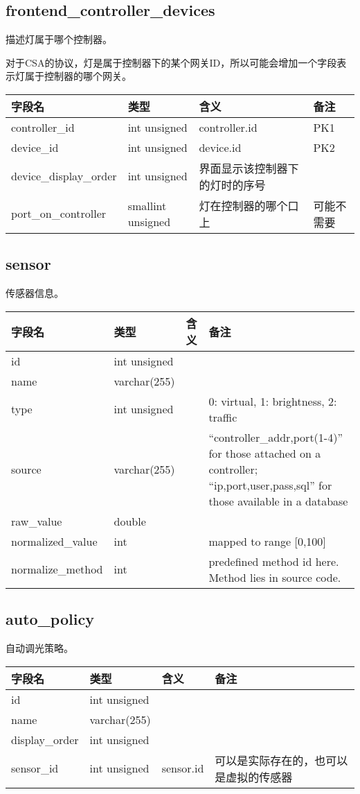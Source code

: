 \subsection{frontend\_controller\_devices}\label{frontendux5fcontrollerux5fdevices}

描述灯属于哪个控制器。

对于CSA的协议，灯是属于控制器下的某个网关ID，所以可能会增加一个字段表示灯属于控制器的哪个网关。

\begin{longtabu}[c]{@{}lXXX@{}}
\toprule
字段名 & 类型 & 含义 & 备注\tabularnewline
\midrule
\endhead
controller\_id & int unsigned & controller.id & PK1\tabularnewline
device\_id & int unsigned & device.id & PK2\tabularnewline
device\_display\_order & int unsigned & 界面显示该控制器下的灯时的序号
&\tabularnewline
port\_on\_controller & smallint unsigned & 灯在控制器的哪个口上 &
可能不需要\tabularnewline
\bottomrule
\end{longtabu}

\subsection{sensor}\label{sensor}

传感器信息。

\begin{longtabu}[c]{@{}lXXX@{}}
\toprule
字段名 & 类型 & 含义 & 备注\tabularnewline
\midrule
\endhead
id & int unsigned & &\tabularnewline
name & varchar(255) & &\tabularnewline
type & int unsigned & & 0: virtual, 1: brightness, 2:
traffic\tabularnewline
source & varchar(255) & & ``controller\_addr,port(1-4)'' for those
attached on a controller; ``ip,port,user,pass,sql'' for those available
in a database\tabularnewline
raw\_value & double & &\tabularnewline
normalized\_value & int & & mapped to range {[}0,100{]}\tabularnewline
normalize\_method & int & & predefined method id here. Method lies in
source code.\tabularnewline
\bottomrule
\end{longtabu}

\subsection{auto\_policy}\label{autoux5fpolicy}

自动调光策略。

\begin{longtabu}[c]{@{}lXXX@{}}
\toprule
字段名 & 类型 & 含义 & 备注\tabularnewline
\midrule
\endhead
id & int unsigned & &\tabularnewline
name & varchar(255) & &\tabularnewline
display\_order & int unsigned & &\tabularnewline
sensor\_id & int unsigned & sensor.id &
可以是实际存在的，也可以是虚拟的传感器\tabularnewline
\bottomrule
\end{longtabu}

